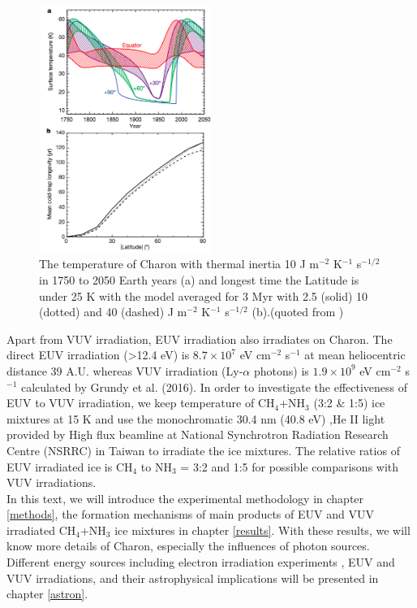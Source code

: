 \begin{figure}
\centering
\includegraphics[width=0.5\textwidth]{figures/chapter1/thermal.png}
\caption{The temperature of Charon with thermal inertia 10 J m$^{-2}$ K$^{-1}$ s$^{-1/2}$ in 1750 to 2050 Earth years (a) and longest time the Latitude is under 25 K with the model averaged for 3 Myr with 2.5 (solid) 10 (dotted) and 40 (dashed) J m$^{-2}$ K$^{-1}$ s$^{-1/2}$ (b).(quoted from \cite{grundy2016formation})}
\label{fig:Charon_thermal}
\end{figure}

Apart from VUV irradiation, EUV irradiation also irradiates on Charon. The direct EUV irradiation (>12.4 eV) is $8.7 \times 10^7$ eV cm$^{-2}$ s$^{-1}$ at mean heliocentric distance 39 A.U. whereas VUV irradiation (Ly-$\alpha$ photons) is $1.9 \times 10^9$ eV cm$^{-2}$ s$^{-1}$ calculated by Grundy et al. (2016)\cite{grundy2016formation}. In order to investigate the effectiveness of EUV to VUV irradiation, we keep temperature of CH$_4$+NH$_3$ (3:2 \& 1:5) ice mixtures at 15 K and use the monochromatic 30.4 nm (40.8 eV) ,He II light provided by High flux beamline at National Synchrotron Radiation Research Centre (NSRRC) in Taiwan to irradiate the ice mixtures. The relative ratios of EUV irradiated ice is CH$_4$ to NH$_3$ = 3:2 and 1:5 for possible comparisons with VUV irradiations. \\

In this text, we will introduce the experimental methodology in chapter \ref{methods}, the formation mechanisms of main products of  EUV and VUV irradiated CH$_4$+NH$_3$ ice mixtures in chapter \ref{results}. With these results, we will know more details of Charon, especially the influences of photon sources. Different energy sources including electron irradiation experiments , EUV and VUV irradiations, and their astrophysical implications will be presented in chapter \ref{astron}.\\

